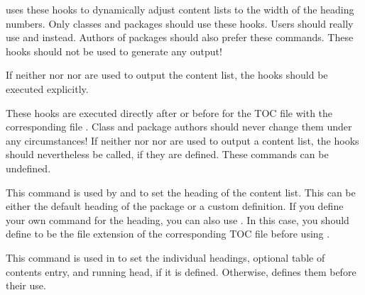 \KOMAScript{} uses these hooks to dynamically adjust content lists to the
width of the heading numbers. Only classes and packages should use these
hooks. Users should really use
 and
 instead. Authors of packages should
also prefer these commands. These hooks should not be used to generate any
output!

If neither  nor
 nor  are
used to output the content list, the hooks should be executed explicitly.%
\EndIndexGroup


\begin{Declaration}
\end{Declaration}
These hooks are executed directly after
 or before
 for the TOC file with the
corresponding file . Class and package
authors should never change them under any circumstances! If
neither  nor
 nor  are
used to output a content list, the hooks should nevertheless be called, if
they are defined. These commands can be undefined.%
\iffalse %
For an appropriate test, see \DescRef{scrbase.cmd.Ifundefinedorrelax}%
\IndexCmd{Ifundefinedorrelax} in \autoref{sec:scrbase.if},
\DescPageRef{scrbase.cmd.Ifundefinedorrelax}.%
\fi%
\EndIndexGroup


\begin{Declaration}
\end{Declaration}
This command is used by  and
 to set the heading of the content list.
This can be either the default heading of the  package or a
custom definition. If you define your own command for the heading, you can
also use . In this case, you should define
 to be the file
extension of the corresponding TOC file before using
.%
\EndIndexGroup


\begin{Declaration}
\end{Declaration}
This command is used in  to set the
individual headings, optional table of contents entry, and running head, if it
is defined. Otherwise,  defines them
before their use.%
\EndIndexGroup



